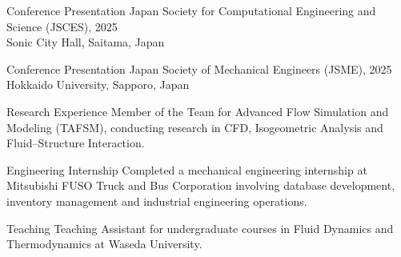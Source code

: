 
\AchievementsSection

\Achievement
{Conference Presentation}
{Japan Society for Computational Engineering and Science (JSCES), 2025\\
Sonic City Hall, Saitama, Japan}

\vspace{0.20cm}

\Achievement
{Conference Presentation}
{Japan Society of Mechanical Engineers (JSME), 2025\\
Hokkaido University, Sapporo, Japan}

\vspace{0.20cm}

\Achievement
{Research Experience}
{
Member of the Team for Advanced Flow Simulation and Modeling
(TAFSM), conducting research in CFD, Isogeometric Analysis and
Fluid--Structure Interaction.
}

\vspace{0.20cm}

\Achievement
{Engineering Internship}
{
Completed a mechanical engineering internship at Mitsubishi
FUSO Truck and Bus Corporation involving database development,
inventory management and industrial engineering operations.
}

\vspace{0.20cm}

\Achievement
{Teaching}
{
Teaching Assistant for undergraduate courses in Fluid Dynamics
and Thermodynamics at Waseda University.
}
